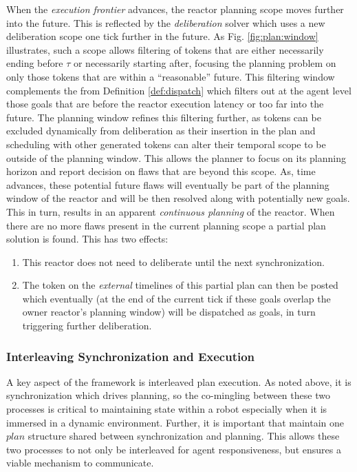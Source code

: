 When the {\em execution frontier} advances, the reactor planning scope
moves further into the future. This is reflected by the {\em
  deliberation} solver which uses a new deliberation scope one tick
further in the future. As Fig. \ref{fig:plan:window} illustrates, such
a scope allows filtering of tokens that are either necessarily ending
before $\tau$ or necessarily starting after, focusing the planning
problem on only those tokens that are within a ``reasonable'' future.
This filtering window complements the  from
Definition \ref{def:dispatch} which filters out at the agent level
those goals that are before the reactor execution latency or too far
into the future.  The planning window refines this filtering further,
as tokens can be excluded dynamically from deliberation as their
insertion in the plan and scheduling with other generated tokens can
alter their temporal scope to be outside of the planning window.  This
allows the planner to focus on its planning horizon and report
decision on flaws that are beyond this scope. As, time advances, these
potential future flaws will eventually be part of the planning window
of the reactor and will be then resolved along with potentially new
goals.  This in turn, results in an apparent \emph{continuous
  planning} of the reactor. When there are no more flaws present in
the current planning scope a partial plan solution is found. This has
two effects:

\begin{enumerate}

\item This reactor does not need to deliberate until the next
  synchronization. 

\item The token on the {\em external} timelines of this partial plan
  can then be posted which eventually (at the end of the current tick
  if these goals overlap the owner reactor's planning window) will be
  dispatched as goals, in turn triggering further deliberation.

\end{enumerate}


\subsubsection{Interleaving Synchronization and Execution}
\label{sec:arch:intertwine}

A key aspect of the \rx framework is interleaved plan execution. As
noted above, it is synchronization which drives planning, so the
co-mingling between these two processes is critical to maintaining
state within a robot especially when it is immersed in a dynamic
environment. Further, it is important that \rx maintain
one $plan$ structure shared between synchronization and planning. This
allows these two processes to not only be interleaved for agent
responsiveness, but ensures a viable mechanism to communicate.

